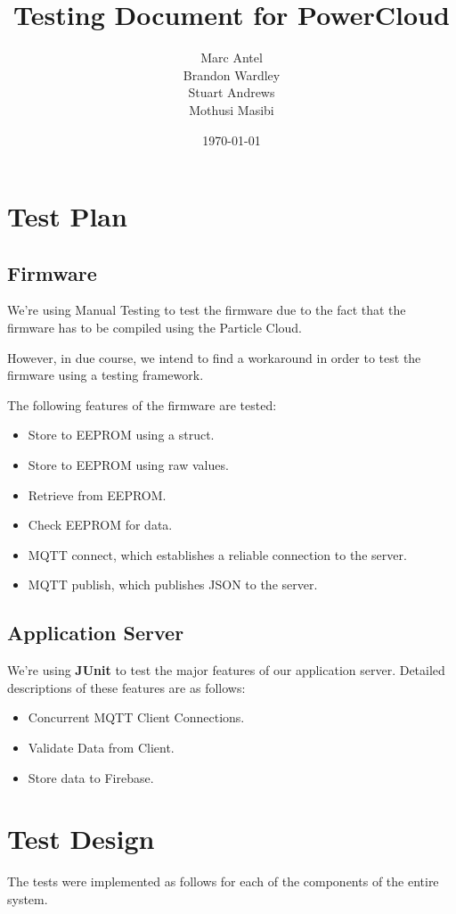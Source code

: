 \documentclass[a4paper,10pt]{article}
\title{Testing Document for PowerCloud}
\author{Marc Antel\\ Brandon Wardley\\ Stuart Andrews\\ Mothusi Masibi}
\date{\today}
\begin{document}
	\maketitle
	\newpage
	\section{Test Plan}
		\subsection{Firmware}
			We're using Manual Testing to test the firmware due to the fact that the firmware has to be compiled using the Particle Cloud.
			
			However, in due course, we intend to find a workaround in order to test the firmware using a testing framework.
			
			The following features of the firmware are tested:
			\begin{itemize}
				\item Store to EEPROM using a struct.
				\item Store to EEPROM using raw values.
				\item Retrieve from EEPROM.
				\item Check EEPROM for data.
				\item MQTT connect, which establishes a reliable connection to the server.
				\item MQTT publish, which publishes JSON to the server.
			\end{itemize}
			
		\subsection{Application Server}
			We're using \textbf{JUnit} to test the major features of our application server.
			Detailed descriptions of these features are as follows:
				\begin{itemize}
					\item Concurrent MQTT Client Connections.
					\item Validate Data from Client.
					\item Store data to Firebase.
				\end{itemize}
				
	\section{Test Design}
	The tests were implemented as follows for each of the components of the entire system.
\end{document}

